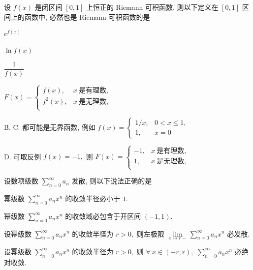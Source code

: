 \begin{question}
设 $f(x)$ 是闭区间 $[0, 1]$ 上恒正的 Riemann 可积函数, 则以下定义在 $[0, 1]$ 区间上的函数中, 必然也是 Riemann 可积函数的是 \paren[A]

\begin{choices}
\item $e^{f(x)}$
\item $\ln{f(x)}$
\item $\dfrac{1}{f(x)}$
\item $F(x) = \begin{cases}
f(x), & x ~ \text{是有理数}, \\
f^2(x), & x ~ \text{是无理数}, \\
\end{cases}$
\end{choices}
\end{question}

\begin{solution}
B. C. 都可能是无界函数, 例如 $f(x) = \begin{cases}
1 / x, & 0 < x \leqslant 1, \\
1, & x = 0
\end{cases}$

D. 可取反例 $f(x) = -1,$ 则 $F(x) = \begin{cases}
-1, & x ~ \text{是有理数}, \\
1, & x ~ \text{是无理数}, \\
\end{cases}$
\end{solution}

\begin{question}
设数项级数 $\sum\limits_{n=0}^\infty a_n$ 发散, 则以下说法正确的是 \paren[D]

\begin{choices}
\item 幂级数 $\sum\limits_{n=0}^\infty a_n x^n$ 的收敛半径必小于 $1.$
\item 幂级数 $\sum\limits_{n=0}^\infty a_n x^n$ 的收敛域必包含于开区间 $(-1, 1).$
\item 设幂级数 $\sum\limits_{n=0}^\infty a_n x^n$ 的收敛半径为 $r > 0,$ 则左极限 $\lim\limits_{x \to r-} \sum\limits_{n=0}^\infty a_n x^n$ 必发散.
\item 设幂级数 $\sum\limits_{n=0}^\infty a_n x^n$ 的收敛半径为 $r > 0,$ 则 $\forall ~ x \in (-r, r),$ $\sum\limits_{n=0}^\infty a_n x^n$ 必绝对收敛.
\end{choices}
\end{question}

